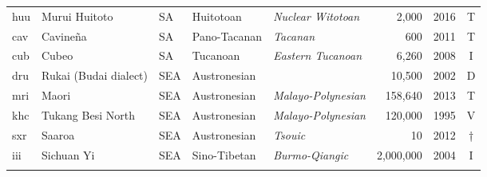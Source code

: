\begin{table}
\begin{tabularx}{\textwidth}{lQlQQrlc}
 huu & {{Murui Huitoto}} &  SA & {Huitotoan} & {\textit{Nuclear Witotoan}} &  2,000 & 2016 & T\\
 cav & {{Cavineña}} &  SA & {Pano-Tacanan} & {\textit{Tacanan}} &  600 & 2011 & T\\
 cub & {{Cubeo}} &  SA & {Tucanoan} & {\textit{Eastern Tucanoan}} &  6,260 & 2008 & I\\
 dru & {{{Rukai} (Budai dialect)}} &  SEA & {Austronesian} &  &  10,500 & 2002 & D\\
 mri & {{Maori}} &  SEA  & {Austronesian} & {\textit{Malayo-Polynesian}} &  158,640 & 2013 & T\\
 khc & {{{Tukang Besi} North}} &  SEA  & {Austronesian} & {\textit{Malayo-Polynesian}} &  120,000 & 1995 & V\\
 sxr & {{Saaroa}} &  SEA  & {Austronesian} & {\textit{Tsouic}} &  10 & 2012 & †\\
 iii & {{Sichuan Yi}} &  SEA & {Sino-Tibetan} & {\textit{Burmo-Qiangic}} &  2,000,000 & 2004 & I\\
 \lspbottomrule
\end{tabularx}
\end{table}


